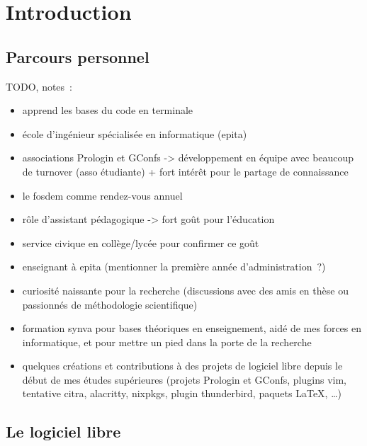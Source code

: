\chapter{Introduction}

\section{Parcours personnel}

TODO, notes :

\begin{itemize}
    \item apprend les bases du code en terminale
    \item école d'ingénieur spécialisée en informatique (\gls{epita})
    \item associations Prologin et GConfs -> développement en équipe avec beaucoup de turnover (asso
        étudiante) + fort intérêt pour le partage de connaissance
    \item le \gls{fosdem} comme rendez-vous annuel
    \item rôle d'assistant pédagogique -> fort goût pour l'éducation
    \item service civique en collège/lycée pour confirmer ce goût
    \item enseignant à \gls{epita} (mentionner la première année d'administration ?)
    \item curiosité naissante pour la recherche (discussions avec des amis en thèse ou passionnés de
        méthodologie scientifique)
    \item formation \gls{synva} pour bases théoriques en enseignement, aidé de mes forces en informatique, et pour
        mettre un pied dans la porte de la recherche
    \item quelques créations et contributions à des projets de logiciel libre depuis le début de mes études
        supérieures (projets Prologin et GConfs, plugins vim, tentative citra, alacritty, nixpkgs, plugin
        thunderbird, paquets \LaTeX, \ldots)
\end{itemize}

\section{Le logiciel libre}

